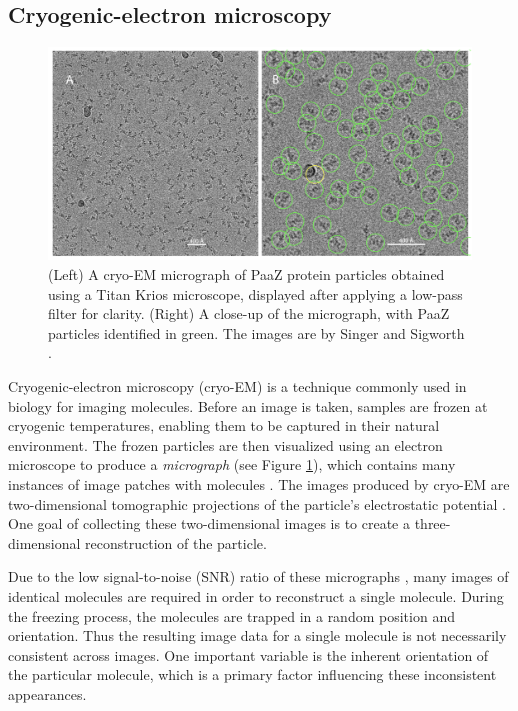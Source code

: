 \documentclass{article}
\numberwithin{equation}{section}
\theoremstyle{definition}
\begin{document}
\subsection{Cryogenic-electron microscopy}
\begin{figure}
    \centering
    \includegraphics[width=\textwidth]{images/cryo-em.png}
    \caption{(Left) A cryo-EM micrograph of PaaZ protein particles obtained using a Titan Krios microscope, displayed after applying a low-pass filter for clarity. (Right) A close-up of the micrograph, with PaaZ particles identified in green. The images are by Singer and Sigworth \cite{SingerSigworth2020}.}
    \label{fig:cryo-em}
\end{figure}
Cryogenic-electron microscopy (cryo-EM) is a technique commonly used in biology for imaging molecules. Before an image is taken, samples are frozen at cryogenic temperatures, enabling them to be captured in their natural environment. The frozen particles are then visualized using an electron microscope to produce a \textit{micrograph} (see Figure \ref{fig:cryo-em}), which contains many instances of image patches with molecules \cite{Frank_2006}. The images produced by cryo-EM are two-dimensional tomographic projections of the particle's electrostatic potential \cite{Vulovi__2013}. One goal of collecting these two-dimensional images is to create a three-dimensional reconstruction of the particle.

Due to the low signal-to-noise (SNR) ratio of these micrographs \cite{singer2018mathematics}, many images of identical molecules are required in order to reconstruct a single molecule. During the freezing process, the molecules are trapped in a random position and orientation. Thus the resulting image data for a single molecule is not necessarily consistent across images. One important variable is the inherent orientation of the particular molecule, which is a primary factor influencing these inconsistent appearances. 
\end{document}
